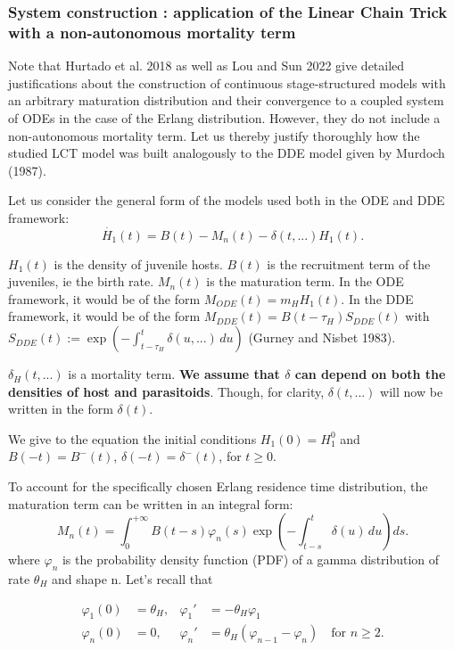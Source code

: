 \documentclass[12pt,a4paper,onecolumn]{article}
\begin{document}
\subsubsection{System construction : application of the Linear Chain Trick with a non-autonomous mortality term}
Note that Hurtado et al. 2018 as well as Lou and Sun 2022 give detailed justifications about the construction of continuous stage-structured models with an arbitrary maturation distribution and their convergence to a coupled system of ODEs in the case of the Erlang distribution. However, they do not include a non-autonomous mortality term. Let us thereby justify thoroughly how the studied LCT model was built analogously to the DDE model given by Murdoch (1987).

Let us consider the general form of the models used both in the ODE and DDE framework:
\begin{equation}
\dot{H_{1}}(t) = B(t) - M_n(t) - \delta(t, ...) H_1(t).
\end{equation}

$H_1(t)$ is the density of juvenile hosts. $B(t)$ is the recruitment term of the juveniles, ie the birth rate. $M_n(t)$ is the maturation term. In the ODE framework, it would be of the form $M_{ODE}(t)= m_H H_1(t)$. In the DDE framework, it would be of the form $M_{DDE}(t) = B(t-\tau_H)S_{DDE}(t)$ with $S_{DDE}(t) := \exp\left( -\int_{t-\tau_H}^{t} \delta(u, ...) \, du \right)$ (Gurney and Nisbet 1983). 

$\delta_H(t, ...)$ is a mortality term. \textbf{We assume that $\delta$ can depend on both the densities of host and parasitoids}. Though, for clarity, $\delta(t, ...)$ will now be written in the form $\delta(t)$.

We give to the equation the initial conditions $H_1(0) = H_1^0$ and $B(-t) = B^{-}(t)$, $\delta(-t) = \delta^{-}(t)$, for $t \geq 0$.

To account for the specifically chosen Erlang residence time distribution, the maturation term can be written in an integral form:
\begin{equation}
M_n(t) = \int_0^{+\infty} B(t-s)\varphi_n(s) \exp\left( -\int_{t-s}^{t} \delta(u) \, du \right) ds.
\end{equation}
where $\varphi_n$ is the probability density function (PDF) of a gamma distribution of rate $\theta_H$ and shape n. Let's recall that

\begin{align}
\varphi_1(0) &= \theta_H, & \varphi_1' &= -\theta_H \varphi_1 \\
\varphi_n(0) &= 0, & \varphi_n' &= \theta_H (\varphi_{n-1} - \varphi_n) \quad \text{for } n \geq 2.
\end{align}
\end{document}
